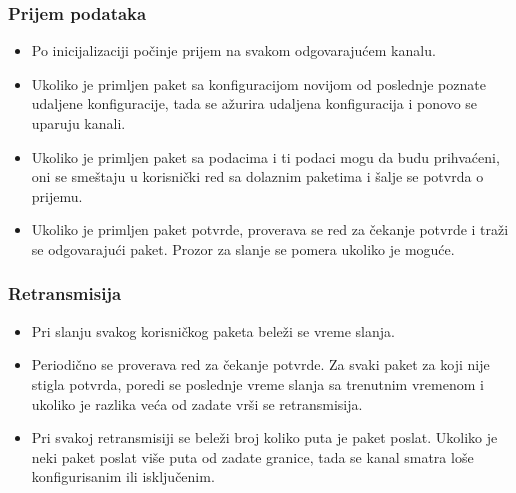 \documentclass{beamer}
\begin{document}
    \begin{frame}
        \frametitle{Prijem podataka}

        \begin{itemize}
            \item{Po inicijalizaciji počinje prijem na svakom
                    odgovarajućem kanalu.}
            \item{Ukoliko je primljen paket sa konfiguracijom novijom
                    od poslednje poznate udaljene konfiguracije,
                    tada se ažurira udaljena konfiguracija i ponovo se
                    uparuju kanali.}
            \item{Ukoliko je primljen paket sa podacima i ti podaci
                    mogu da budu prihvaćeni, oni se smeštaju u korisnički
                    red sa dolaznim paketima i šalje se potvrda o prijemu.}
            \item{Ukoliko je primljen paket potvrde, proverava se red za
                    čekanje potvrde i traži se odgovarajući paket. Prozor
                    za slanje se pomera ukoliko je moguće.}
        \end{itemize}
    \end{frame}

    \begin{frame}
        \frametitle{Retransmisija}

        \begin{itemize}
            \item{Pri slanju svakog korisničkog paketa beleži se vreme slanja.}
            \item{Periodično se proverava red za čekanje potvrde. Za svaki
                    paket za koji nije stigla potvrda, poredi se poslednje
                    vreme slanja sa trenutnim vremenom i ukoliko je razlika
                    veća od zadate vrši se retransmisija.}
            \item{Pri svakoj retransmisiji se beleži broj koliko puta je paket
                    poslat. Ukoliko je neki paket poslat više puta od zadate
                    granice, tada se kanal smatra loše konfigurisanim ili
                    isključenim.}
        \end{itemize}
    \end{frame}
\end{document}
